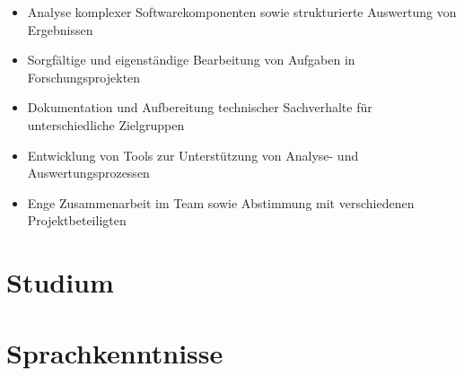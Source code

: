 \documentclass[10pt,a4paper,sans]{moderncv}        %
\begin{document}
{\begin{itemize}
\item Analyse komplexer Softwarekomponenten sowie strukturierte Auswertung von Ergebnissen
\item Sorgfältige und eigenständige Bearbeitung von Aufgaben in Forschungsprojekten
\item Dokumentation und Aufbereitung technischer Sachverhalte für unterschiedliche Zielgruppen
\item Entwicklung von Tools zur Unterstützung von Analyse- und Auswertungsprozessen
\item Enge Zusammenarbeit im Team sowie Abstimmung mit verschiedenen Projektbeteiligten
\end{itemize}
}


\section{Studium}


\section{Sprachkenntnisse}

\end{document}
